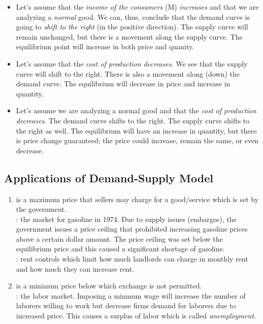 \documentclass{article}
\begin{document}
\begin{itemize}
  \item Let's assume that the \emph{income of the consumers} (M) \emph{increases} and that we are analyzing a \emph{normal} good. We can, thus, conclude that the demand curve is going to \emph{shift to the right} (in the positive direction). The supply curve will remain unchanged, but there is a movement along the supply curve. The equilibrium point will increase in both price and quanity. 
  \item Let's assume that the \emph{cost of production} \emph{decreases}. We see that the supply curve will shift to the right. There is also a movement along (down) the demand curve. The equilibrium will decrease in price and increase in quantity. 
  \item Let's assume we are analyzing a normal good and that the \emph{cost of production decreases}. The demand curve shifts to the right. The supply curve shifts to the right as well. The equilibrium will have an increase in quantity, but there is price change guaranteed; the price could increase, remain the same, or even decrease. 
\end{itemize}

\subsection{Applications of Demand-Supply Model}

\begin{enumerate}
  \item {} is a maximum price that sellers may charge for a good/service which is set by the government. \\ 

    : the market for gasoline in 1974. Due to supply issues (embargos), the government issues a price ceiling that prohibited increasing gasoline prices above a certain dollar amount. The price ceiling was set below the equilibrium price and this caused a significant shortage of gasoline. \\ 

    : rent controls which limit how much landlords can charge in monthly rent and how much they can increase rent. 

  \item {} is a minimum price below which exchange is not permitted. \\

    : the labor market. Imposing a minmum wage will increase the number of laborers willing to work but decrease firms demand for laborers due to increased price. This causes a surplus of labor which is called \emph{unemployment}. 
\end{enumerate}
\end{document}
